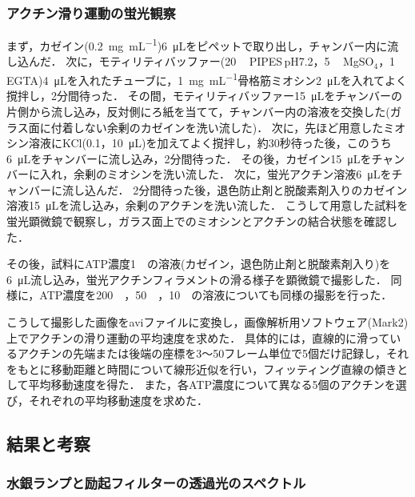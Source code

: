 \documentclass[a4paper,11pt, titlepage]{jsarticle}
\begin{document}
\subsubsection{アクチン滑り運動の蛍光観察}
まず，カゼイン(\SI{0.2}{\mg\per\milli\liter})\SI{6}{\micro\liter}をピペットで取り出し，チャンバー内に流し込んだ．
次に，モティリティバッファー(\SI{20}{\milli\Molar}\,PIPES\,pH7.2，\SI{5}{\milli\Molar}\,MgSO$_4$，\SI{1}{\milli\Molar}\,EGTA)\SI{4}{\micro\liter}を入れたチューブに，\SI{1}{\mg\per\milli\liter}骨格筋ミオシン\SI{2}{\micro\liter}を入れてよく撹拌し，2分間待った．
その間，モティリティバッファー\SI{15}{\micro\liter}をチャンバーの片側から流し込み，反対側にろ紙を当てて，チャンバー内の溶液を交換した(ガラス面に付着しない余剰のカゼインを洗い流した)．
次に，先ほど用意したミオシン溶液にKCl(\SI{0.1}{\Molar}，\SI{10}{\micro\liter})を加えてよく撹拌し，約30秒待った後，このうち\SI{6}{\micro\liter}をチャンバーに流し込み，2分間待った．
その後，カゼイン\SI{15}{\micro\liter}をチャンバーに入れ，余剰のミオシンを洗い流した．
次に，蛍光アクチン溶液\SI{6}{\micro\liter}をチャンバーに流し込んだ．
2分間待った後，退色防止剤と脱酸素剤入りのカゼイン溶液\SI{15}{\micro\liter}を流し込み，余剰のアクチンを洗い流した．
こうして用意した試料を蛍光顕微鏡で観察し，ガラス面上でのミオシンとアクチンの結合状態を確認した．

その後，試料にATP濃度\SI{1}{\milli\Molar}の溶液(カゼイン，退色防止剤と脱酸素剤入り)を\SI{6}{\micro\liter}流し込み，蛍光アクチンフィラメントの滑る様子を顕微鏡で撮影した．
同様に，ATP濃度を\SI{200}{\micro\Molar}，\SI{50}{\micro\Molar}，\SI{10}{\micro\Molar}の溶液についても同様の撮影を行った．

こうして撮影した画像をaviファイルに変換し，画像解析用ソフトウェア(Mark2)上でアクチンの滑り運動の平均速度を求めた．
具体的には，直線的に滑っているアクチンの先端または後端の座標を3～50フレーム単位で5個だけ記録し，それをもとに移動距離と時間について線形近似を行い，フィッティング直線の傾きとして平均移動速度を得た．
また，各ATP濃度について異なる5個のアクチンを選び，それぞれの平均移動速度を求めた．

\subsection{結果と考察}
\subsubsection{水銀ランプと励起フィルターの透過光のスペクトル}
\end{document}
